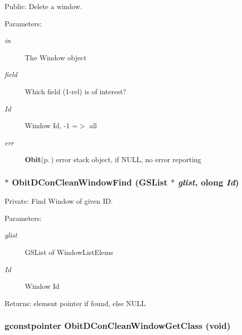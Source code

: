 Public: Delete a window. 

\begin{Desc}
\item[Parameters:]
\begin{description}
\item[{\em in}]The Window object \item[{\em field}]Which field (1-rel) is of interest? \item[{\em Id}]Window Id, -1 =$>$ all \item[{\em err}]{\bf Obit}{\rm (p.\,\pageref{structObit})} error stack object, if NULL, no error reporting \end{description}
\end{Desc}
\subsubsection{ $\ast$ Obit\-DCon\-Clean\-Window\-Find (GSList $\ast$ {\em glist}, {\bf olong} {\em Id})}\label{ObitDConCleanWindow_8c_a9}


Private: Find Window of given ID. 

\begin{Desc}
\item[Parameters:]
\begin{description}
\item[{\em glist}]GSList of Window\-List\-Elems \item[{\em Id}]Window Id \end{description}
\end{Desc}
\begin{Desc}
\item[Returns:]element pointer if found, else NULL \end{Desc}
\subsubsection{\setlength{\rightskip}{0pt plus 5cm}gconstpointer Obit\-DCon\-Clean\-Window\-Get\-Class (void)}\label{ObitDConCleanWindow_8c_a12}


